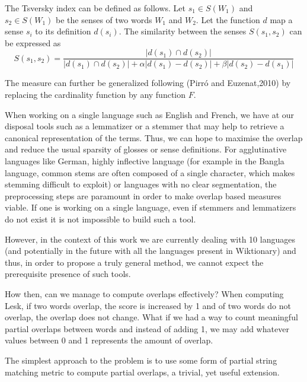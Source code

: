 \documentclass[10pt, a4paper]{article}
\begin{document}
The Tsversky index can be defined as follows. Let \(s_1 \in S(W_1)\)  and \(s_2 \in S(W_1)\) be the senses of two words \(W_1\) and \(W_2\). Let the function \(d\) map a sense \(s_i\) to its definition \(d(s_i)\). The similarity between the senses \(S(s_1, s_2)\) can be expressed as 
\[
S(s_1,s_2) = 
\frac{|d(s_1)\cap d(s_2)|}{|d(s_1)\cap d(s_2)| + \alpha |d(s_1)-d(s_2)| + \beta |d(s_2)-d(s_1)|}
\]

The measure can further be generalized following (Pirró and Euzenat,2010) by replacing the cardinality function by any function \(F\).


 When working on a single language such as English and French, we have at our disposal tools such as a lemmatizer or a stemmer that may help to retrieve a canonical representation of the terms. Thus, we can hope to maximise the overlap and reduce the usual sparsity of glosses or sense definitions. For agglutinative languages like German, highly inflective language (for example in the Bangla language, common stems are often composed of a single character, which makes stemming difficult to exploit) or languages with no clear segmentation, the preprocessing steps are paramount in order to make overlap based measures viable. If one is working on a single language, even if stemmers and lemmatizers do not exist it is not impossible to build such a tool.

However, in the context of this work we are currently dealing with 10 languages (and potentially in the future with all the languages present in Wiktionary) and thus, in order to propose a truly general method, we cannot expect the prerequisite presence of such tools. 

How then, can we manage to compute overlaps effectively? When computing Lesk, if two words overlap, the score is increased by 1 and of two words do not overlap, the overlap does not change. What if we had a way to count meaningful partial overlaps between words and instead of adding 1, we may add whatever values between 0 and 1 represents the amount of overlap.

The simplest approach to the problem is to use some form of partial string matching metric to compute partial overlaps, a trivial, yet useful extension. 
\end{document}
